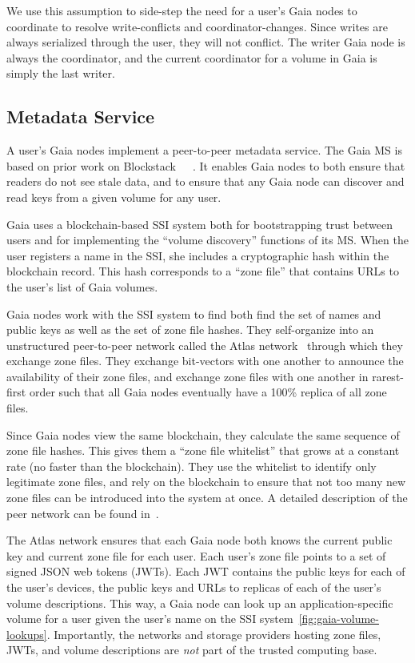 We use this assumption to side-step the need for a user's Gaia nodes to
coordinate to resolve write-conflicts and coordinator-changes.  Since writes are
always serialized through the user, they will not conflict.  The writer Gaia
node is always the coordinator, and the current coordinator for a volume in Gaia
is simply the last writer.

\subsection{Metadata Service}

A user's Gaia nodes
implement a peer-to-peer metadata service.  The Gaia MS is based on prior work
on Blockstack~\cite{blockstack}~\cite{virtualchain}~\cite{ali2017}.  It enables
Gaia nodes to both ensure that readers do not see stale data, and to ensure that
any Gaia node can discover and read keys from a given volume for any user.

Gaia uses a blockchain-based SSI system both for bootstrapping trust between
users and for implementing the ``volume discovery'' functions of its MS.  When the
user registers a name in the SSI, she includes a cryptographic hash within the
blockchain record.  This hash corresponds to a ``zone file'' that
contains URLs to the user's list of Gaia volumes.

Gaia nodes work with the SSI system to find both find the set of names and public keys
as well as the set of zone file hashes.  They self-organize into an unstructured
peer-to-peer network called the Atlas network~\cite{blockstack-white-paper}
through which they exchange zone files.  They exchange
bit-vectors with one another to announce the availability of their zone files,
and exchange zone files with one another in rarest-first order such that all
Gaia nodes eventually have a 100\% replica of all zone files.

Since Gaia nodes view the same blockchain, they calculate the same sequence of zone
file hashes.  This gives them a ``zone file whitelist'' that grows at a constant
rate (no faster than the blockchain).  They use the whitelist to identify only
legitimate zone files, and rely on the blockchain to ensure that not too many
new zone files can be introduced into the system at once.  A detailed
description of the peer network can be found in~\cite{ali2017}.


The Atlas network ensures that each Gaia node both knows the current public key
and current zone file for each user.  Each user's
zone file points to a set of signed JSON web tokens (JWTs).  Each JWT contains the
public keys for each of the user's devices, the public keys and URLs to
replicas of each of the user's volume descriptions.  This way, a Gaia node can
look up an application-specific volume for a user given the user's name on the
SSI system~\ref{fig:gaia-volume-lookups}.  Importantly, the networks and storage
providers hosting zone files, JWTs, and volume descriptions are \emph{not} part
of the trusted computing base.

